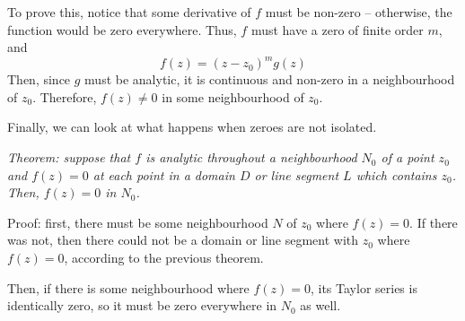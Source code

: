 \documentclass{article}
\begin{document}
To prove this, notice that some derivative of $f$ must be non-zero -- otherwise, the function would be zero everywhere. Thus, $f$ must have a zero of finite order $m$, and
\[	
	f(z) = (z - z_0)^m g(z)
\]
Then, since $g$ must be analytic, it is continuous and non-zero in a neighbourhood of $z_0$. Therefore, $f(z) \neq 0$ in some neighbourhood of $z_0$.

Finally, we can look at what happens when zeroes are not isolated.

\textit{Theorem: suppose that $f$ is analytic throughout a neighbourhood $N_0$ of a point $z_0$ and $f(z) = 0$ at each point in a domain $D$ or line segment $L$ which contains $z_0$. Then, $f(z) = 0$ in $N_0$.}

Proof: first, there must be some neighbourhood $N$ of $z_0$ where $f(z) = 0$. If there was not, then there could not be a domain or line segment with $z_0$ where $f(z) = 0$, according to the previous theorem.

Then, if there is some neighbourhood where $f(z) = 0$, its Taylor series is identically zero, so it must be zero everywhere in $N_0$ as well.
\end{document}
